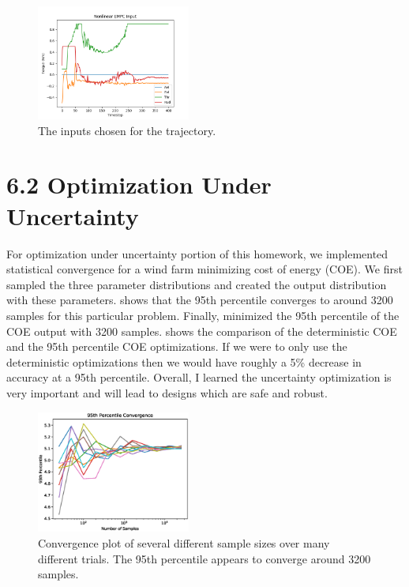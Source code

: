 \documentclass{article}
\begin{document}
\begin{figure}[htbp]
	\centering
	\includegraphics[width=0.45\textwidth]{figures/inputs.png}
	\caption{The inputs chosen for the trajectory.}
	\label{fig:inputs_results}
\end{figure}

\section*{6.2 Optimization Under Uncertainty}

For optimization under uncertainty portion of this homework, we implemented statistical convergence for a wind farm minimizing cost of energy (COE). We first sampled the three parameter distributions and created the output distribution with these parameters.  shows that the 95th percentile converges to around 3200 samples for this particular problem. Finally, minimized the 95th percentile of the COE output with 3200 samples.  shows the comparison of the deterministic COE and the 95th percentile COE optimizations. If we were to only use the deterministic optimizations then we would have roughly a 5\% decrease in accuracy at a 95th percentile. Overall, I learned the uncertainty optimization is very important and will lead to designs which are safe and robust.



\begin{figure}[htbp]
	\centering
	\includegraphics[width=0.45\textwidth]{figures/convergence.eps}
	\caption{Convergence plot of several different sample sizes over many different trials. The 95th percentile appears to converge around 3200 samples.}
	\label{fig:convergence}
\end{figure}
\end{document}
